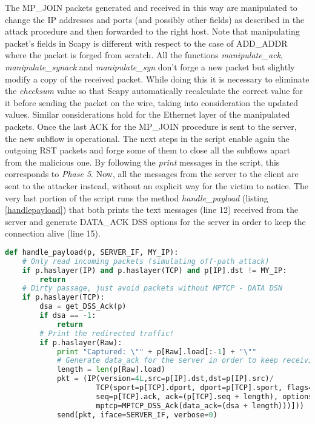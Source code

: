 The MP\_JOIN packets generated and received in this way are manipulated to change the IP addresses and ports (and possibly other fields) as described in the attack procedure and then forwarded to the right host. Note that manipulating packet's fields in Scapy is different with respect to the case of ADD\_ADDR where the packet is forged from scratch. All the functions \textit{manipulate\_ack}, \textit{manipulate\_synack} and \textit{manipulate\_syn} don't forge a new packet but slightly modify a copy of the received packet. While doing this it is necessary to eliminate the \textit{checksum} value so that Scapy automatically recalculate the correct value for it before sending the packet on the wire, taking into consideration the updated values. Similar considerations hold for the Ethernet layer of the manipulated packets. 
Once the last ACK for the MP\_JOIN procedure is sent to the server, the new subflow is operational. The next steps in the script enable again the outgoing RST packets and forge some of them to close all the subflows apart from the malicious one. By following the \textit{print} messages in the script, this corresponds to \textit{Phase 5}. Now, all the messages from the server to the client are sent to the attacker instead, without an explicit way for the victim to notice. 
The very last portion of the script runs the method \textit{handle\_payload} (listing \ref{handlepayload}) that both prints the text messages (line 12) received from the server and generate DATA\_ACK DSS options for the server in order to keep the connection alive (line 15). 

\begin{lstlisting}[language=python, caption=\textit{Filter function for the sniffing tool when receiving redirected traffic of the hijacked connection from the server}, label=handlepayload]
def handle_payload(p, SERVER_IF, MY_IP):
    # Only read incoming packets (simulating off-path attack)
    if p.haslayer(IP) and p.haslayer(TCP) and p[IP].dst != MY_IP:
        return
    # Dirty passage, just avoid packets without MPTCP - DATA DSN
    if p.haslayer(TCP):
        dsa = get_DSS_Ack(p)
        if dsa == -1:
            return
        # Print the redirected traffic!
        if p.haslayer(Raw):
            print "Captured: \"" + p[Raw].load[:-1] + "\""
            # Generate data_ack for the server in order to keep receiving the next messages
            length = len(p[Raw].load)
            pkt = (IP(version=4L,src=p[IP].dst,dst=p[IP].src)/                          \
                     TCP(sport=p[TCP].dport, dport=p[TCP].sport, flags="A",             \
                     seq=p[TCP].ack, ack=(p[TCP].seq + length), options=[TCPOption_MP(  \
                     mptcp=MPTCP_DSS_Ack(data_ack=(dsa + length)))]))
            send(pkt, iface=SERVER_IF, verbose=0)
\end{lstlisting}


